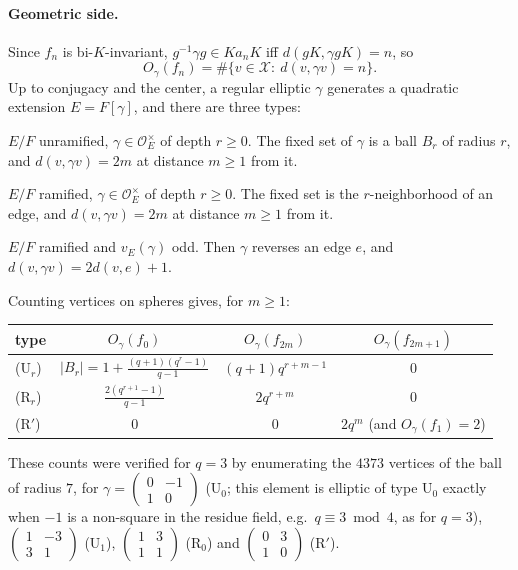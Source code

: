 \documentclass[12pt,letterpaper]{article}
\numberwithin{equation}{section}
\theoremstyle{plain}
\theoremstyle{remark}
\theoremstyle{plain}
\theoremstyle{definition}
\theoremstyle{remark}
\theoremstyle{remark}
\newcommand{\OO}{\mathcal{O}}
\begin{document}
\paragraph{Geometric side.} Since $f_n$ is bi-$K$-invariant, $g^{-1}\gamma g\in Ka_nK$ iff $d(gK,\gamma gK)=n$, so
\begin{equation}\label{eq:6.3}
O_\gamma(f_n)=\#\{v\in\mathcal X:\ d(v,\gamma v)=n\}.
\end{equation}
Up to conjugacy and the center, a regular elliptic $\gamma$ generates a quadratic extension $E=F[\gamma]$, and there are three types:
\begin{description}[leftmargin=1.2em]
\item[(U$_r$)] $E/F$ unramified, $\gamma\in\OO_E^\times$ of depth $r\ge0$. The fixed set of $\gamma$ is a ball $B_r$ of radius $r$, and $d(v,\gamma v)=2m$ at distance $m\ge1$ from it.
\item[(R$_r$)] $E/F$ ramified, $\gamma\in\OO_E^\times$ of depth $r\ge0$. The fixed set is the $r$-neighborhood of an edge, and $d(v,\gamma v)=2m$ at distance $m\ge1$ from it.
\item[(R$'$)] $E/F$ ramified and $v_E(\gamma)$ odd. Then $\gamma$ reverses an edge $e$, and $d(v,\gamma v)=2d(v,e)+1$.
\end{description}
Counting vertices on spheres gives, for $m\ge1$:
\begin{center}
\begin{tabular}{lccc}
\toprule
type & $O_\gamma(f_0)$ & $O_\gamma(f_{2m})$ & $O_\gamma(f_{2m+1})$\\
\midrule
(U$_r$) & $|B_r|=1+\frac{(q+1)(q^r-1)}{q-1}$ & $(q+1)q^{r+m-1}$ & $0$\\[1ex]
(R$_r$) & $\frac{2(q^{r+1}-1)}{q-1}$ & $2q^{r+m}$ & $0$\\[1ex]
(R$'$) & $0$ & $0$ & $2q^m$ (and $O_\gamma(f_1)=2$)\\
\bottomrule
\end{tabular}
\end{center}
These counts were verified for $q=3$ by enumerating the $4373$ vertices of the ball of radius $7$, for $\gamma=\left(\begin{smallmatrix}0&-1\\1&0\end{smallmatrix}\right)$ (U$_0$; this element is elliptic of type U$_0$ exactly when $-1$ is a non-square in the residue field, e.g.\ $q\equiv3\bmod4$, as for $q=3$), $\left(\begin{smallmatrix}1&-3\\3&1\end{smallmatrix}\right)$ (U$_1$), $\left(\begin{smallmatrix}1&3\\1&1\end{smallmatrix}\right)$ (R$_0$) and $\left(\begin{smallmatrix}0&3\\1&0\end{smallmatrix}\right)$ (R$'$).
\end{document}
